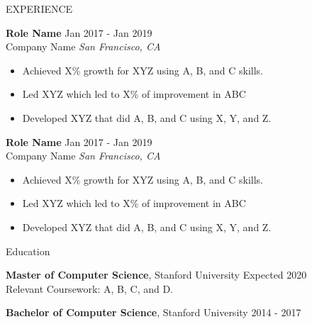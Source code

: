 \documentclass{resume} %
\begin{document}
\begin{rSection}{EXPERIENCE}

\textbf{Role Name} \hfill Jan 2017 - Jan 2019\\
Company Name \hfill \textit{San Francisco, CA}
 \begin{itemize}
    \itemsep -3pt {} 
     \item Achieved X\% growth for XYZ using A, B, and C skills.
     \item Led XYZ which led to X\% of improvement in ABC
    \item Developed XYZ that did A, B, and C using X, Y, and Z. 
 \end{itemize}
 
\textbf{Role Name} \hfill Jan 2017 - Jan 2019\\
Company Name \hfill \textit{San Francisco, CA}
 \begin{itemize}
    \itemsep -3pt {} 
     \item Achieved X\% growth for XYZ using A, B, and C skills.
     \item Led XYZ which led to X\% of improvement in ABC
    \item Developed XYZ that did A, B, and C using X, Y, and Z. 
 \end{itemize}

\end{rSection} 





\begin{rSection}{Education}

{\bf Master of Computer Science}, Stanford University \hfill {Expected 2020}\\
Relevant Coursework: A, B, C, and D.

{\bf Bachelor of Computer Science}, Stanford University \hfill {2014 - 2017}


\end{rSection}
\vspace{-5 pt}
\end{document}
